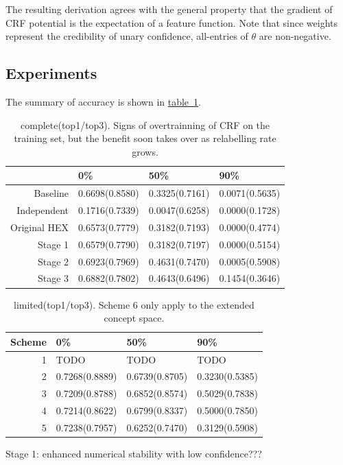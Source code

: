 \documentclass[11pt,a4paper]{article}
\begin{document}
The resulting derivation agrees with the general property that the gradient of CRF potential is the expectation of a feature function. Note that since weights represent the credibility of unary confidence, all-entries of $\theta$ are non-negative.

\subsection{Experiments}
\label{sec:exp2}

The summary of accuracy is shown in \hyperref[tab:summary]{table~\ref{tab:summary}}.

\begin{table}[htbp]
\centering
\begin{tabular}{r|l|l|l}
 & 0\% & 50\% & 90\%\\
\hline
Baseline & 0.6698(0.8580) & 0.3325(0.7161) & 0.0071(0.5635)\\
Independent & 0.1716(0.7339) & 0.0047(0.6258) & 0.0000(0.1728)\\
Original HEX & 0.6573(0.7779) & 0.3182(0.7193) & 0.0000(0.4774)\\
Stage 1 & 0.6579(0.7790) & 0.3182(0.7197) & 0.0000(0.5154)\\
Stage 2 & 0.6923(0.7969) & 0.4631(0.7470) & 0.0005(0.5908)\\
Stage 3 & 0.6882(0.7802) & 0.4643(0.6496) & 0.1454(0.3646)
\end{tabular}
\caption{complete(top1/top3). Signs of overtrainning of CRF on the training set, but the benefit soon takes over as relabelling rate grows.}
\label{tab:summary}
\end{table}

\begin{table}[htbp]
\centering
\begin{tabular}{r|l|l|l}
Scheme & 0\% & 50\% & 90\%\\
\hline
1 & TODO & TODO & TODO\\
2 & 0.7268(0.8889) & 0.6739(0.8705) & 0.3230(0.5385)\\
3 & 0.7209(0.8788) & 0.6852(0.8574) & 0.5029(0.7838)\\
4 & 0.7214(0.8622) & 0.6799(0.8337) & 0.5000(0.7850)\\
5 & 0.7238(0.7957) & 0.6252(0.7470) & 0.3129(0.5908)
\end{tabular}
\caption{limited(top1/top3). Scheme 6 only apply to the extended concept space.}
\end{table}

Stage 1: enhanced numerical stability with low confidence???
\end{document}
